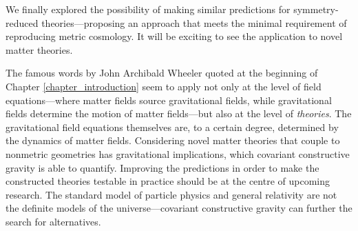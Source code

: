 We finally explored the possibility of making similar predictions for symmetry-reduced theories---proposing an approach that meets the minimal requirement of reproducing metric cosmology. It will be exciting to see the application to novel matter theories.

The famous words by John Archibald Wheeler quoted at the beginning of Chapter \ref{chapter_introduction} seem to apply not only at the level of field equations---where matter fields source gravitational fields, while gravitational fields determine the motion of matter fields---but also at the level of \emph{theories}. The gravitational field equations themselves are, to a certain degree, determined by the dynamics of matter fields. Considering novel matter theories that couple to nonmetric geometries has gravitational implications, which covariant constructive gravity is able to quantify. Improving the predictions in order to make the constructed theories testable in practice should be at the centre of upcoming research. The standard model of particle physics and general relativity are not the definite models of the universe---covariant constructive gravity can further the search for alternatives.

